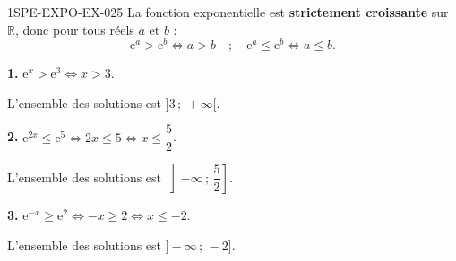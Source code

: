\begin{corrige}{1SPE-EXPO-EX-025}
La fonction exponentielle est \textbf{strictement croissante} sur $\mathbb{R}$, donc pour tous réels $a$ et $b$ :
\[\mathrm{e}^a > \mathrm{e}^b \iff a > b \quad;\quad \mathrm{e}^a \leqslant \mathrm{e}^b \iff a \leqslant b.\]

\textbf{1.} $\mathrm{e}^x > \mathrm{e}^3 \iff x > 3$.

L'ensemble des solutions est $\boxed{]3\,;\,+\infty[}$.

\textbf{2.} $\mathrm{e}^{2x} \leqslant \mathrm{e}^5 \iff 2x \leqslant 5 \iff x \leqslant \dfrac{5}{2}$.

L'ensemble des solutions est $\boxed{\left]-\infty\,;\,\dfrac{5}{2}\right]}$.

\textbf{3.} $\mathrm{e}^{-x} \geqslant \mathrm{e}^2 \iff -x \geqslant 2 \iff x \leqslant -2$.

L'ensemble des solutions est $\boxed{]-\infty\,;\,-2]}$.
\end{corrige}
